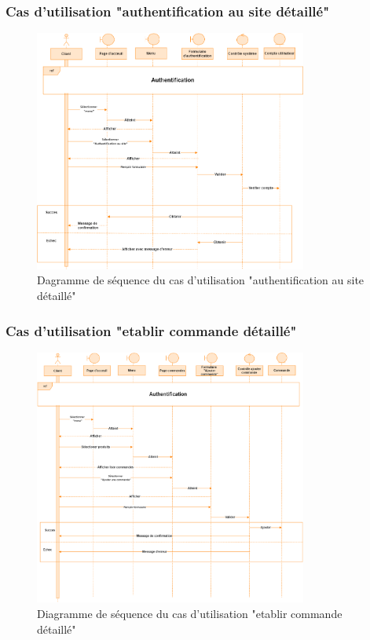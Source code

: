\documentclass[edit,12pt,a4paper,ChapStyle,oneside,doubleinterligne]{report}
\begin{document}
\subsubsection{Cas d'utilisation "authentification au site détaillé"}
\begin{figure}[h!]\label{fig:Authentification au site}
\centering
\includegraphics[width=0.8\textwidth]{images/Authentification au site.png}
\caption{Dagramme de séquence du cas d'utilisation "authentification au site détaillé"}
\end{figure}
\clearpage

\subsubsection{Cas d'utilisation "etablir commande détaillé"}
\begin{figure}[h!]\label{fig:etablir commande}
\centering
\includegraphics[width=0.8\textwidth]{images/Cas_ etablir commande.png}
\caption{Diagramme de séquence du cas d'utilisation "etablir commande détaillé"}
\end{figure}
\clearpage
\end{document}
